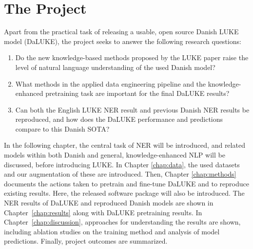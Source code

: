 \documentclass[main.tex]{subfiles}
\begin{document}
\section{The Project}%
\label{sec:project}
Apart from the practical task of releasing a usable, open source Danish LUKE model (DaLUKE), the project seeks to answer the following research questions:
\begin{enumerate}[itemsep=.5em]
    \item
        Do the new knowledge-based methods proposed by the LUKE paper raise the level of natural language understanding of the used Danish model?
    \item
        What methods in the applied data engineering pipeline and the knowledge-enhanced pretraining task are important for the final DaLUKE results?
    \item
        Can both the English LUKE NER result and previous Danish NER results be reproduced, and how does the DaLUKE performance and predictions compare to this Danish SOTA?
\end{enumerate}
In the following chapter, the central task of NER will be introduced, and related models within both Danish and general, knowledge-enhanced NLP will be discussed, before introducing LUKE.
In Chapter \ref{chap:data}, the used datasets and our augmentation of these are introduced.
Then, Chapter \ref{chap:methods} documents the actions taken to pretrain and fine-tune DaLUKE and to reproduce existing results.
Here, the released software package  will also be introduced.
The NER results of DaLUKE and reproduced Danish models are shown in Chapter~\ref{chap:results} along with DaLUKE pretraining results.
In Chapter~\ref{chap:discussion}, approaches for understanding the results are shown, including ablation studies on the training method and analysis of model predictions.
Finally, project outcomes are summarized.
\end{document}
